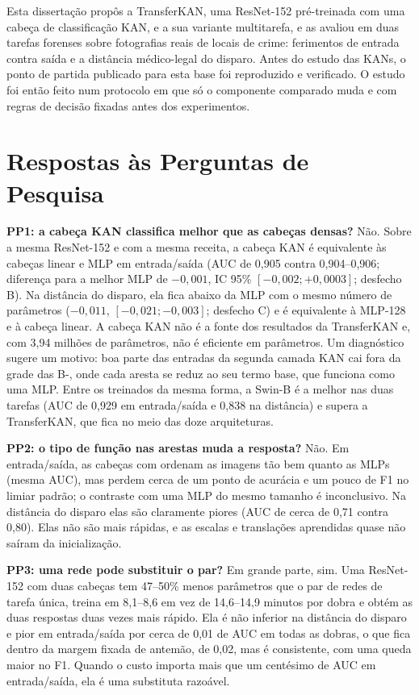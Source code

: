 \label{chap:conclusions}

Esta dissertação propôs a TransferKAN, uma ResNet-152 pré-treinada com uma cabeça de classificação KAN, e a sua variante multitarefa, e as avaliou em duas tarefas forenses sobre fotografias reais de locais de crime: ferimentos de entrada contra saída e a distância médico-legal do disparo. Antes do estudo das KANs, o ponto de partida publicado para esta base foi reproduzido e verificado. O estudo foi então feito num protocolo em que só o componente comparado muda e com regras de decisão fixadas antes dos experimentos.

\section{Respostas às Perguntas de Pesquisa}
\label{sec:respostas}

\textbf{PP1: a cabeça KAN classifica melhor que as cabeças densas?} Não. Sobre a mesma ResNet-152 e com a mesma receita, a cabeça KAN é equivalente às cabeças linear e MLP em entrada/saída (AUC de 0,905 contra 0,904--0,906; diferença para a melhor MLP de $-0{,}001$, IC 95\% $[-0{,}002; +0{,}0003]$; desfecho B). Na distância do disparo, ela fica abaixo da MLP com o mesmo número de parâmetros ($-0{,}011$, $[-0{,}021; -0{,}003]$; desfecho C) e é equivalente à MLP-128 e à cabeça linear. A cabeça KAN não é a fonte dos resultados da TransferKAN e, com 3,94 milhões de parâmetros, não é eficiente em parâmetros. Um diagnóstico sugere um motivo: boa parte das entradas da segunda camada KAN cai fora da grade das B-, onde cada aresta se reduz ao seu termo base, que funciona como uma MLP. Entre os  treinados da mesma forma, a Swin-B é a melhor nas duas tarefas (AUC de 0,929 em entrada/saída e 0,838 na distância) e supera a TransferKAN, que fica no meio das doze arquiteturas.

\textbf{PP2: o tipo de função nas arestas muda a resposta?} Não. Em entrada/saída, as cabeças com  ordenam as imagens tão bem quanto as MLPs (mesma AUC), mas perdem cerca de um ponto de acurácia e um pouco de F1 no limiar padrão; o contraste com uma MLP do mesmo tamanho é inconclusivo. Na distância do disparo elas são claramente piores (AUC de cerca de 0,71 contra 0,80). Elas não são mais rápidas, e as escalas e translações aprendidas quase não saíram da inicialização.

\textbf{PP3: uma rede pode substituir o par?} Em grande parte, sim. Uma ResNet-152 com duas cabeças tem 47--50\% menos parâmetros que o par de redes de tarefa única, treina em 8,1--8,6 em vez de 14,6--14,9 minutos por dobra e obtém as duas respostas duas vezes mais rápido. Ela é não inferior na distância do disparo e pior em entrada/saída por cerca de 0,01 de AUC em todas as dobras, o que fica dentro da margem fixada de antemão, de 0,02, mas é consistente, com uma queda maior no F1. Quando o custo importa mais que um centésimo de AUC em entrada/saída, ela é uma substituta razoável.

